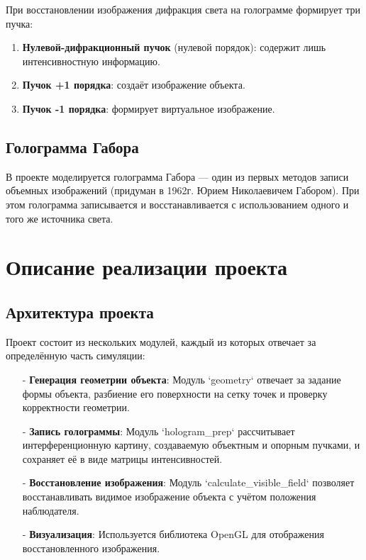 \documentclass[aps,twocolumn,secnumarabic,balancelastpage,amsmath,amssymb,nofootinbib, floatfix]{revtex4-1}
\begin{document}
При восстановлении изображения дифракция света на голограмме формирует три пучка:  
\begin{enumerate}
	\item \textbf{Нулевой-дифракционный пучок} (нулевой порядок): содержит лишь интенсивностную информацию.  
	\item \textbf{Пучок +1 порядка}: создаёт изображение объекта.  
	\item \textbf{Пучок -1 порядка}: формирует виртуальное изображение.  
\end{enumerate}
\subsection{Голограмма Габора }

В проекте моделируется голограмма Габора — один из первых методов записи объемных изображений (придуман в 1962г. Юрием Николаевичем Габором). При этом голограмма записывается и восстанавливается с использованием одного и того же источника света.  

\section{Описание реализации проекта } 

\subsection{Архитектура проекта }

Проект состоит из нескольких модулей, каждый из которых отвечает за определённую часть симуляции:  
\begin{enumerate}
\item[-]\textbf{Генерация геометрии объекта}:  
Модуль `geometry` отвечает за задание формы объекта, разбиение его поверхности на сетку точек и проверку корректности геометрии.  

\item[-]\textbf{Запись голограммы}:  
Модуль `hologram\_prep` рассчитывает интерференционную картину, создаваемую объектным и опорным пучками, и сохраняет её в виде матрицы интенсивностей.  

\item[-]\textbf{Восстановление изображения}:  
Модуль `calculate\_visible\_field` позволяет восстанавливать видимое изображение объекта с учётом положения наблюдателя.  

\item[-]\textbf{Визуализация}:  
Используется библиотека OpenGL для отображения восстановленного изображения.  
\end{enumerate}
\end{document}
